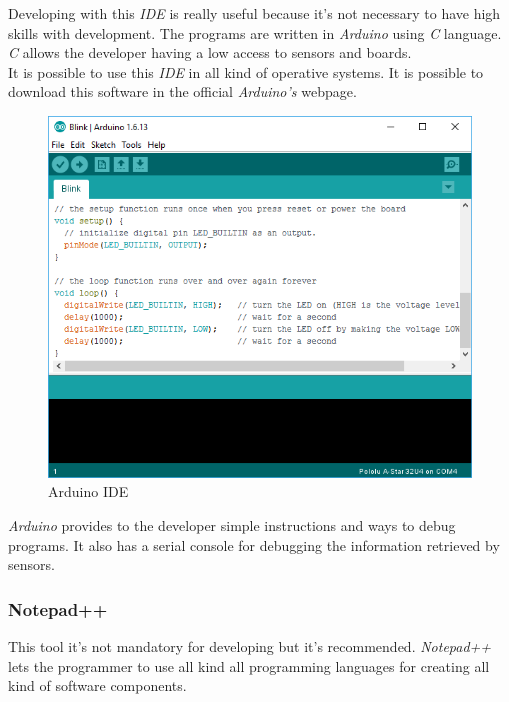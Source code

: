 Developing with this \textit{IDE} is really useful because it's not necessary to have high skills with development. The programs are written in \textit{Arduino} using \textit{C} language. \textit{C} allows the developer having a low access to sensors and boards.\\

It is possible to use this \textit{IDE} in all kind of operative systems. It is possible to download this software in the official \textit{Arduino's} webpage.\\

\begin{figure}[H]
\begin{centering}
\includegraphics[scale=0.7]{IMGS/ARDUINO_IDE.png}
\caption{Arduino IDE \label{ARDUINO_IDE}}
\end{centering}
\end{figure}

\textit{Arduino} provides to the developer simple instructions and ways to debug programs. It also has a serial console for debugging the information retrieved by sensors.

\subsubsection{Notepad++}

This tool it's not mandatory for developing but it's recommended. \textit{Notepad++} lets the programmer to use all kind all programming languages for creating all kind of software components.


